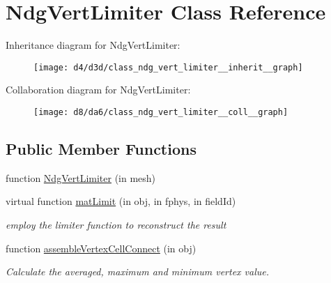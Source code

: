 \hypertarget{class_ndg_vert_limiter}{}\section{Ndg\+Vert\+Limiter Class Reference}
\label{class_ndg_vert_limiter}


Inheritance diagram for Ndg\+Vert\+Limiter\+:
\nopagebreak
\begin{figure}[H]
\begin{center}
\leavevmode
\texttt{[image: d4/d3d/class\_ndg\_vert\_limiter\_\_inherit\_\_graph]}
\end{center}
\end{figure}


Collaboration diagram for Ndg\+Vert\+Limiter\+:
\nopagebreak
\begin{figure}[H]
\begin{center}
\leavevmode
\texttt{[image: d8/da6/class\_ndg\_vert\_limiter\_\_coll\_\_graph]}
\end{center}
\end{figure}
\subsection*{Public Member Functions}
\begin{DoxyCompactItemize}
\item 
function \hyperlink{class_ndg_vert_limiter_af301f96d7f8b872f3185b727e8fc3d74}{Ndg\+Vert\+Limiter} (in mesh)
\item 
virtual function \hyperlink{class_ndg_vert_limiter_ac46cd8aff2658389eb62d813a8861d43}{mat\+Limit} (in obj, in fphys, in field\+Id)
\begin{DoxyCompactList}\small\item\em employ the limiter function to reconstruct the result \end{DoxyCompactList}\item 
function \hyperlink{class_ndg_vert_limiter_a07e49e9ce059fd87e922d186f72a2abb}{assemble\+Vertex\+Cell\+Connect} (in obj)
\begin{DoxyCompactList}\small\item\em Calculate the averaged, maximum and minimum vertex value. \end{DoxyCompactList}\end{DoxyCompactItemize}
